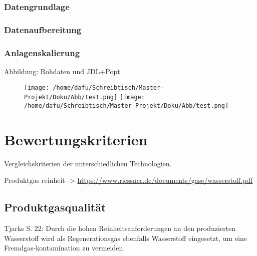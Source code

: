 \documentclass[onecolumn,10pt,titlepage]{article}
\begin{document}
\subsubsection{Datengrundlage}
\subsubsection{Datenaufbereitung}
\subsubsection{Anlagenskalierung}
Abbildung: Rohdaten und JDL+Popt
\begin{figure}[H]
	
	\centering
	\texttt{[image: /home/dafu/Schreibtisch/Master-Projekt/Doku/Abb/test.png]}
	\texttt{[image: /home/dafu/Schreibtisch/Master-Projekt/Doku/Abb/test.png]}
	\caption{ }
	\label{fig:JDL_COST} 
\end{figure}













\section{Bewertungskriterien}
\label{Bewertungs-Krit}

Vergleichskriterien der unterschiedlichen Technologien.

Produktgas reinheit
-> \url{https://www.riessner.de/documents/gase/wasserstoff.pdf}


\subsection{Produktgasqualität}
Tjarks S. 22: Durch die hohen
Reinheitsanforderungen an den produzierten Wasserstoff wird als Regenerationsgas
ebenfalls Wasserstoff eingesetzt, um eine Fremdgas-kontamination zu vermeiden.
\end{document}

